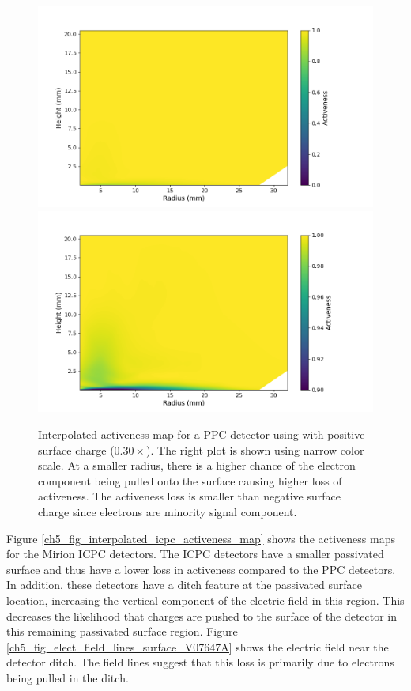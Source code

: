\begin{figure}%
\centering
\includegraphics[trim={1cm 0cm 3.0cm 1cm},clip,width=0.49\linewidth]{ch5/figs/activeness_map_cubic_sc=0.3_ponama_1_5000_linear_full.png}
\includegraphics[trim={1cm 0cm 3.0cm 1cm},clip,width=0.49\linewidth]{ch5/figs/activeness_map_cubic_sc=0.3_ponama_1_5000_linear.png}
\caption{Interpolated activeness map for a PPC detector using \ehd with positive surface charge ($0.30\times${\scunit}). The right plot is shown using narrow color scale. At a smaller radius, there is a higher chance of the electron component being pulled onto the surface causing higher loss of activeness. The activeness loss is smaller than negative surface charge since electrons are minority signal component.}
\label{ch5_fig_interpolated_activeness_map_pos}
\end{figure}

Figure \ref{ch5_fig_interpolated_icpc_activeness_map} shows the activeness maps for the Mirion ICPC detectors. The ICPC detectors have a smaller passivated surface and thus have a lower loss in activeness compared to the PPC detectors.  In addition, these detectors have a ditch feature at the passivated surface location, increasing the vertical component of the electric field in this region. This decreases the likelihood that charges are pushed to the surface of the detector in this remaining passivated surface region. Figure \ref{ch5_fig_elect_field_lines_surface_V07647A} shows the electric field near the detector ditch. The field lines suggest that this loss is primarily due to electrons being pulled in the ditch.

